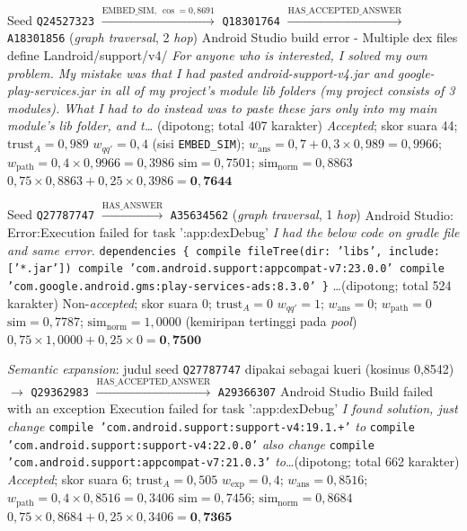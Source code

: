 {Seed \texttt{Q24527323} $\xrightarrow{\text{EMBED\_SIM},\ \cos=0{,}8691}$ \texttt{Q18301764} $\xrightarrow{\text{HAS\_ACCEPTED\_ANSWER}}$ \texttt{A18301856} (\emph{graph traversal}, 2 \emph{hop})}
{Android Studio build error - Multiple dex files define Landroid/support/v4/}
{\emph{For anyone who is interested, I solved my own problem. My mistake was that I had pasted android-support-v4.jar and google-play-services.jar in all of my project's module lib folders (my project consists of 3 modules). What I had to do instead was to paste these jars only into my main module's lib folder, and t\ldots} (dipotong; total 407 karakter)}
{\emph{Accepted}; skor suara 44; $\mathrm{trust}_A=0{,}989$}
{$w_{qq'}=0{,}4$ (sisi \texttt{EMBED\_SIM}); $w_{\mathrm{ans}}=0{,}7+0{,}3\times 0{,}989=0{,}9966$; $w_{\mathrm{path}}=0{,}4\times 0{,}9966=0{,}3986$}
{$\mathrm{sim}=0{,}7501$; $\mathrm{sim}_{\mathrm{norm}}=0{,}8863$}
{$0{,}75\times 0{,}8863+0{,}25\times 0{,}3986=\mathbf{0{,}7644}$}

{Seed \texttt{Q27787747} $\xrightarrow{\text{HAS\_ANSWER}}$ \texttt{A35634562} (\emph{graph traversal}, 1 \emph{hop})}
{Android Studio: Error:Execution failed for task ':app:dexDebug'}
{\emph{I had the below code on gradle file and same error.} \texttt{dependencies \{ compile fileTree(dir: 'libs', include: ['*.jar']) compile 'com.android.support:appcompat-v7:23.0.0' compile 'com.google.android.gms:play-services-ads:8.3.0' \}} \ldots (dipotong; total 524 karakter)}
{Non-\emph{accepted}; skor suara 0; $\mathrm{trust}_A=0$}
{$w_{qq'}=1$; $w_{\mathrm{ans}}=0$; $w_{\mathrm{path}}=0$}
{$\mathrm{sim}=0{,}7787$; $\mathrm{sim}_{\mathrm{norm}}=1{,}0000$ (kemiripan tertinggi pada \emph{pool})}
{$0{,}75\times 1{,}0000+0{,}25\times 0=\mathbf{0{,}7500}$}

{\emph{Semantic expansion}: judul seed \texttt{Q27787747} dipakai sebagai kueri (kosinus 0,8542) $\rightarrow$ \texttt{Q29362983} $\xrightarrow{\text{HAS\_ACCEPTED\_ANSWER}}$ \texttt{A29366307}}
{Android Studio Build failed with an exception Execution failed for task ':app:dexDebug'}
{\emph{I found solution, just change} \texttt{compile 'com.android.support:support-v4:19.1.+'} \emph{to} \texttt{compile 'com.android.support:support-v4:22.0.0'} \emph{also change} \texttt{compile 'com.android.support:appcompat-v7:21.0.3'} \emph{to}\ldots (dipotong; total 662 karakter)}
{\emph{Accepted}; skor suara 6; $\mathrm{trust}_A=0{,}505$}
{$w_{\mathrm{exp}}=0{,}4$; $w_{\mathrm{ans}}=0{,}8516$; $w_{\mathrm{path}}=0{,}4\times 0{,}8516=0{,}3406$}
{$\mathrm{sim}=0{,}7456$; $\mathrm{sim}_{\mathrm{norm}}=0{,}8684$}
{$0{,}75\times 0{,}8684+0{,}25\times 0{,}3406=\mathbf{0{,}7365}$}

